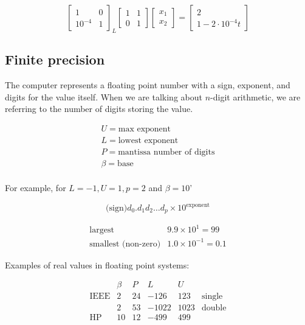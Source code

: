 \[
	\begin{bmatrix}
		1 & 0 \\ 10^{-4} & 1
	\end{bmatrix}_L
	\begin{bmatrix}
		1 & 1 \\ 0 & 1
	\end{bmatrix}
	\begin{bmatrix}
		x_1 \\ x_2
	\end{bmatrix} =
	\begin{bmatrix}
		2 \\ 1 - 2 \cdot 10^{-4}t
	\end{bmatrix}
\]


\subsection{Finite precision}

The computer represents a floating point number with a sign, exponent, and digits for the value itself. When we are talking about $n$-digit arithmetic, we are referring to the number of digits storing the value.

\[
	\begin{matrix}
		U = \text{max exponent} \\
		L = \text{lowest exponent} \\
		P = \text{mantissa number of digits} \\
		\beta = \text{base} \\
	\end{matrix}
\]

For example, for $L=-1, U=1, p=2$ and $\beta = 10$'

\[
	\text{(sign)} d_0 . d_1 d_2 \dots d_p \times 10^{\text{exponent}}
\]

\[
	\begin{matrix}
		\text{largest} & 9.9 \times 10^1 = 99\\
		\text{smallest (non-zero)} & 1.0 \times 10^{-1} = 0.1
	\end{matrix}
\]

Examples of real values in floating point systems:

\[
	\begin{matrix}
		& \beta & P & L & U \\
		\text{IEEE} & 2 & 24 & -126 & 123 & \text{single} \\
					& 2 & 53 & -1022 & 1023 & \text{double}\\ 
		\text{HP}   & 10 & 12 & -499 & 499
	\end{matrix}
\]

